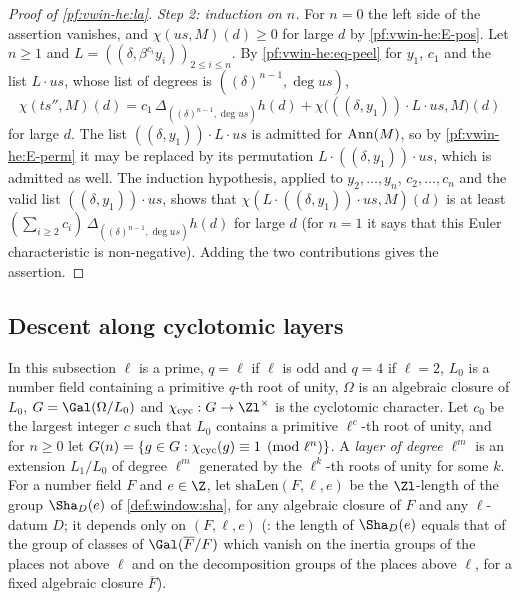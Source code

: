 \begin{proof}[Proof of \cref{pf:vwin-he:la}]
\emph{Step 2: induction on $n$.} For $n=0$ the left side of the assertion vanishes, and $\chi(us,M)(d)\ge0$ for large
$d$ by \ref{pf:vwin-he:E-pos}. Let $n\ge1$ and $L=((\delta,\beta^{c_i}y_i))_{2\le i\le n}$. By
\eqref{pf:vwin-he:eq-peel} for $y_1$, $c_1$ and the list $L\cdot us$, whose list of degrees is
$((\delta)^{n-1},\deg us)$,
\[
 \chi(ts'',M)(d)=c_1\,\Delta_{((\delta)^{n-1},\deg us)}h(d)+\chi\bigl(((\delta,y_1))\cdot L\cdot us,M\bigr)(d)
\]
for large $d$. The list $((\delta,y_1))\cdot L\cdot us$ is admitted for $\operatorname{Ann}(M)$, so by \ref{pf:vwin-he:E-perm}
it may be replaced by its permutation $L\cdot((\delta,y_1))\cdot us$, which is admitted as well. The induction
hypothesis, applied to $y_2,\dots,y_n$, $c_2,\dots,c_n$ and the valid list $((\delta,y_1))\cdot us$, shows that
$\chi(L\cdot((\delta,y_1))\cdot us,M)(d)$ is at least $(\sum_{i\ge2}c_i)\,\Delta_{((\delta)^{n-1},\deg us)}h(d)$ for
large $d$ (for $n=1$ it says that this Euler characteristic is non-negative). Adding the two contributions gives the
assertion.
\end{proof}

\subsection{Descent along cyclotomic layers}\label{sec:pf:vwin-he:descent}

In this subsection $\ell$ is a prime, $q=\ell$ if $\ell$ is odd and $q=4$ if $\ell=2$, $L_0$ is a number field
containing a primitive $q$-th root of unity, $\Omega$ is an algebraic closure of $L_0$, $G=\Gal(\Omega/L_0)$ and
$\vwinhecyc:G\to\Zl^\times$ is the cyclotomic character. Let $c_0$ be the largest integer $c$ such that $L_0$ contains a
primitive $\ell^c$-th root of unity, and for $n\ge0$ let $G(n)=\{g\in G:\chi_{\mathrm{cyc}}(g)\equiv1\pmod{\ell^n}\}$. A
\emph{layer of degree $\ell^m$} is an extension $L_1/L_0$ of degree $\ell^m$ generated by the $\ell^k$-th roots of
unity for some $k$. For a number field $F$ and $e\in\Z$, let $\mathrm{shaLen}(F,\ell,e)$ be the $\Zl$-length of the
group $\Sha_D(e)$ of \cref{def:window:sha}, for any algebraic closure of $F$ and any $\ell$-datum $D$; it depends only
on $(F,\ell,e)$ (: the length of $\Sha_D(e)$ equals that of
the group of classes of $\Gal(\overline F/F)$ which vanish on the inertia groups of the places not above $\ell$ and on
the decomposition groups of the places above $\ell$, for a fixed algebraic closure $\overline F$).

